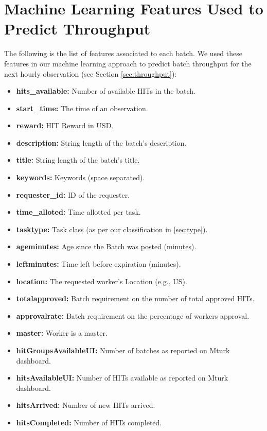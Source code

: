\appendix

\label{ap:feats}
\section{Machine Learning Features Used to Predict Throughput}
The following is the list of features associated to each batch. We used these features in our machine learning approach to predict batch throughput for the next hourly observation (see Section \ref{sec:throughput}):
\begin{itemize}[noitemsep]
\item \textbf{hits\_available:} Number of available HITs in the batch.
\item \textbf{start\_time:} The time of an observation.
\item \textbf{reward:} HIT Reward in USD.
\item \textbf{description:} String length of the batch's description.
\item \textbf{title:} String length of the batch's title.
\item \textbf{keywords:} Keywords (space separated).
\item \textbf{requester\_id:} ID of the requester.
\item \textbf{time\_alloted:} Time allotted per task.
\item \textbf{tasktype:} Task class (as per our classification in \ref{sec:type}).
\item \textbf{ageminutes:} Age since the Batch was posted (minutes).
\item \textbf{leftminutes:} Time left before expiration (minutes).
\item \textbf{location:} The requested worker's Location (e.g., US).
\item \textbf{totalapproved:} Batch requirement on the number of total approved HITs.
\item \textbf{approvalrate:} Batch requirement on the percentage of workers approval.
\item \textbf{master:} Worker is a master.
\item \textbf{hitGroupsAvailableUI:} Number of batches as reported on Mturk dashboard.
\item \textbf{hitsAvailableUI:} Number of HITs available as reported on Mturk dashboard.
\item \textbf{hitsArrived:} Number of new HITs arrived.
\item \textbf{hitsCompleted:} Number of HITs completed.

\end{itemize}
